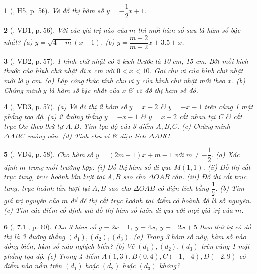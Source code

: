 \documentclass{article}
\newtheorem{baitoan}{}
\begin{document}
\begin{baitoan}[\cite{Binh_boi_duong_Toan_9_tap_1}, H5, p. 56]
	Vẽ đồ thị hàm số $y = -\dfrac{1}{2}x + 1$.
\end{baitoan}

\begin{baitoan}[\cite{Binh_boi_duong_Toan_9_tap_1}, VD1, p. 56]
	Với các giá trị nào của $m$ thì mỗi hàm số sau là hàm số bậc nhất? (a) $y = \sqrt{4 - m}(x - 1)$. (b) $y = \dfrac{m + 2}{m - 2}x + 3.5 + x$.
\end{baitoan}

\begin{baitoan}[\cite{Binh_boi_duong_Toan_9_tap_1}, VD2, p. 57]
	1 hình chữ nhật có 2 kích thước là {\rm10 cm, 15 cm}. Bớt mỗi kích thước của hình chữ nhật đi $x$ {\rm cm} với $0 < x < 10$. Gọi chu vi của hình chữ nhật mới là $y$ {\rm cm}. (a) Lập công thức tính chu vi $y$ của hình chữ nhật mới theo $x$. (b) Chứng minh $y$ là hàm số bậc nhất của $x$ \& vẽ đồ thị hàm số đó.
\end{baitoan}

\begin{baitoan}[\cite{Binh_boi_duong_Toan_9_tap_1}, VD3, p. 57]
	(a) Vẽ đồ thị 2 hàm số $y = x - 2$ \& $y = -x - 1$ trên cùng 1 mặt phẳng tọa độ. (a) 2 đường thẳng $y = -x - 1$ \& $y = x - 2$ cắt nhau tại C \& cắt trục $Ox$ theo thứ tự $A,B$. Tìm tọa độ của 3 điểm $A,B,C$. (c) Chứng minh $\Delta ABC$ vuông cân. (d) Tính chu vi \& diện tích $\Delta ABC$.
\end{baitoan}

\begin{baitoan}[\cite{Binh_boi_duong_Toan_9_tap_1}, VD4, p. 58]
	Cho hàm số $y = (2m + 1)x + m - 1$ với $m\ne-\dfrac{1}{2}$. (a) Xác định $m$ trong mỗi trường hợp: (i) Đồ thị hàm số đi qua $M(1,1)$. (ii) Đồ thị cắt trục tung, trục hoành lần lượt tại $A,B$ sao cho $\Delta OAB$ cân. (iii) Đồ thị cắt trục tung, trục hoành lần lượt tại $A,B$ sao cho $\Delta OAB$ có diện tích bằng $\dfrac{1}{2}$. (b) Tìm giá trị nguyên của $m$ để đồ thị cắt trục hoành tại điểm có hoành độ là số nguyên. (c) Tìm các điểm cố định mà đồ thị hàm số luôn đi qua với mọi giá trị của $m$.
\end{baitoan}

\begin{baitoan}[\cite{Binh_boi_duong_Toan_9_tap_1}, 7.1., p. 60]
	Cho 3 hàm số $y = 2x + 1$, $y = 4x$, $y = -2x + 5$ theo thứ tự có đồ thị là 3 đường thẳng $(d_1),(d_2),(d_3)$. (a) Trong 3 hàm số này, hàm số nào đồng biến, hàm số nào nghịch biến? (b) Vẽ $(d_1),(d_2),(d_3)$ trên cùng 1 mặt phẳng tọa độ. (c) Trong 4 điểm $A(1,3),B(0,4),C(-1,-4),D(-2,9)$ có điểm nào nằm trên $(d_1)$ hoặc $(d_2)$ hoặc $(d_3)$ không?
\end{baitoan}
\end{document}
